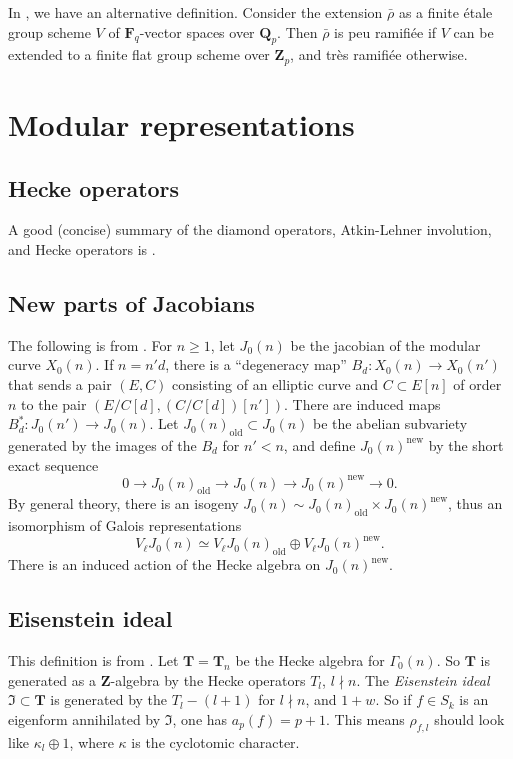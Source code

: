 \documentclass{amsart}
\newcommand{\dF}{\mathbf{F}}
\newcommand{\dQ}{\mathbf{Q}}
\newcommand{\dT}{\mathbf{T}}
\newcommand{\dZ}{\mathbf{Z}}
\newcommand{\fI}{\mathfrak{I}}
\begin{document}
In \cite[8.2]{edixhoven-1992}, we have an alternative definition. Consider the 
extension $\bar\rho$ as a finite \'etale group scheme $V$ of $\dF_q$-vector 
spaces over $\dQ_p$. Then $\bar\rho$ is peu ramifi\'ee if $V$ can be extended 
to a finite flat group scheme over $\dZ_p$, and tr\`es ramifi\'ee otherwise. 





\section{Modular representations}


\subsection{Hecke operators}

A good (concise) summary of the diamond operators, Atkin-Lehner involution, and 
Hecke operators is \cite[ch.2 \S 5]{mw84}. 


\subsection{New parts of Jacobians}

The following is from \cite[\S 2]{mazur-1978}. 
For $n\geqslant 1$, let $J_0(n)$ be the jacobian of the modular curve $X_0(n)$. 
If $n=n' d$, there is a ``degeneracy map'' $B_d:X_0(n)\to X_0(n')$ that sends a 
pair $(E,C)$ consisting of an elliptic curve and $C\subset E[n]$ of order $n$ 
to the pair $(E/C[d],(C/C[d])[n'])$. There are induced maps 
$B_d^\ast:J_0(n')\to J_0(n)$. Let $J_0(n)_\mathrm{old}\subset J_0(n)$ be the 
abelian subvariety generated by the images of the $B_d$ for $n'<n$, and define 
$J_0(n)^\mathrm{new}$ by the short exact sequence 
\[
  0 \to J_0(n)_\mathrm{old} \to J_0(n) \to J_0(n)^\mathrm{new} \to 0 .
\]
By general theory, there is an isogeny 
$J_0(n)\sim J_0(n)_\mathrm{old}\times J_0(n)^\mathrm{new}$, thus an isomorphism 
of Galois representations 
\[
  V_\ell J_0(n) \simeq V_\ell J_0(n)_\mathrm{old}\oplus V_\ell J_0(n)^\mathrm{new} .
\]
There is an induced action of the Hecke algebra on $J_0(n)^\mathrm{new}$. 


\subsection{Eisenstein ideal}

This definition is from \cite[II.9]{mazur-1977}. Let $\dT=\dT_n$ be the Hecke 
algebra for $\Gamma_0(n)$. So $\dT$ is generated as a $\dZ$-algebra by the 
Hecke operators $T_l$, $l\nmid n$. The \emph{Eisenstein ideal} 
$\fI\subset \dT$ is generated by the $T_l-(l+1)$ for $l\nmid n$, and 
$1+w$. So if $f\in S_k$ is an eigenform annihilated by $\fI$, one has 
$a_p(f) = p+1$. This means $\rho_{f,l}$ should look like 
$\kappa_l\oplus 1$, where $\kappa$ is the cyclotomic character. 
\end{document}
